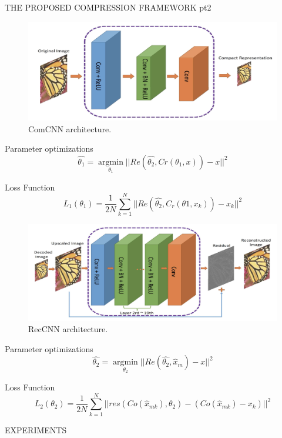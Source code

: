 \documentclass[10pt]{beamer}
\DeclareMathOperator*{\argmin}{argmin}
\begin{document}
\begin{frame}{THE PROPOSED COMPRESSION FRAMEWORK pt2}
    \begin{minipage}{\linewidth}
        \centering
        \begin{minipage}{0.45\linewidth}
            \begin{figure}[H]
                \includegraphics[width = 1 \linewidth]{images/paper3/ComCNN.png}
                \caption{ComCNN architecture.}
            \end{figure}
            \begin{block}{Parameter optimizations}
                \small $$ \hat{\theta_1} = \argmin\limits_{\theta_1}||Re(\hat{\theta_2},Cr(\theta_1,x))-x||^2 $$
            \end{block}
            \begin{block}{Loss Function}
               \tiny $$ L_1(\theta_1) = \frac{1}{2N}\sum_{k=1}^N||Re(\hat{\theta_2}, C_r(\theta1,x_k))-x_k||^2 $$
            \end{block}
        \end{minipage}
        \hspace{0.05\linewidth}
        \begin{minipage}{0.45\linewidth}
            \begin{figure}[htbp]
                \centering
                \includegraphics[width = 1 \linewidth]{images/paper3/RecCNN.png}
                \centering
                \caption{RecCNN architecture.}
            \end{figure}
            \begin{block}{Parameter optimizations}
                \small $$ \hat{\theta_2} = \argmin\limits_{\theta_2}||Re(\hat{\theta_2},\hat{x}_m)-x||^2 $$
            \end{block}
            \begin{block}{Loss Function}
                \tiny $$ L_2(\theta_2) = \frac{1}{2N}\sum_{k=1}^N||res(Co(\hat{x}_{mk}), \theta_2) - (Co(\hat{x}_{mk})-x_k)||^2 $$
             \end{block}
        \end{minipage}
    \end{minipage}
\end{frame}

\begin{frame}{EXPERIMENTS}
    
\end{frame}

    
\end{document}
